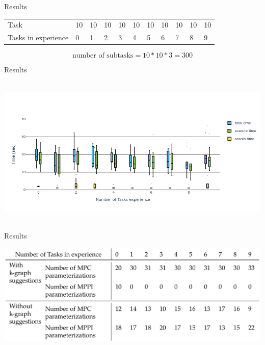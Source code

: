\begin{frame}[fragile]{Results} 
\begin{table}[H]
    \centering
    \begin{tabular}%
    {l | p{0.3cm} p{0.3cm} p{0.3cm} p{0.3cm} p{0.3cm} p{0.3cm} p{0.3cm} p{0.3cm}p{0.3cm} p{0.3cm}}
    Task & 10 & 10  & 10 & 10 & 10 & 10 & 10 & 10 & 10 & 10\\
    Tasks in experience & 0 & 1 & 2 & 3 &4 & 5 &6 & 7& 8  &9\\ 
    \end{tabular}
\end{table}

\[\textrm{number of subtasks} = 10 * 10 * 3 = 300\]
\end{frame}


\begin{frame}[fragile]{Results} 
\begin{center}
  \hbox{\hspace{-0.7cm} \includegraphics[width=1.05\textwidth]{figures/results/random_drive_time_k-graph} }
\end{center}
\end{frame}

\begin{frame}[fragile]{Results} 
\begin{center}
\includegraphics[width=1.0\textwidth]{figures/results/random_drive_para}
\end{center}
\end{frame}


